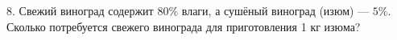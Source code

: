 8. Свежий виноград содержит $80\%$ влаги, а сушёный виноград (изюм) --- $5\%.$
Сколько потребуется свежего винограда для приготовления 1 кг изюма?\\
